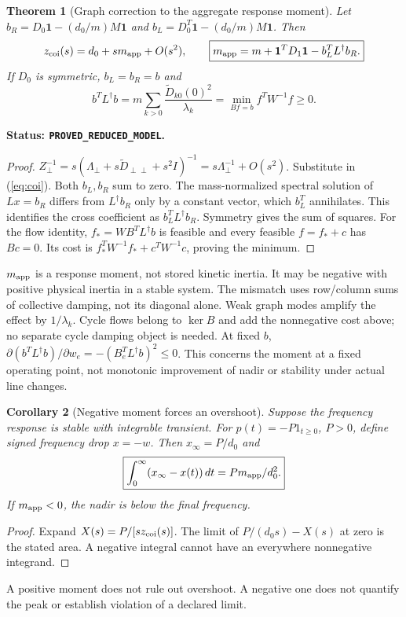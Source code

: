 \documentclass[11pt]{article}
\newtheorem{theorem}{Theorem}
\newtheorem{corollary}[theorem]{Corollary}
\newcommand{\one}{\mathbf{1}}
\newcommand{\status}[1]{\par\smallskip\noindent\textbf{Status: \texttt{#1}.}\ }
\begin{document}
\begin{theorem}[Graph correction to the aggregate response moment]
Let $b_R=D_0\one-(d_0/m)M\one$ and
$b_L=D_0^T\one-(d_0/m)M\one$. Then
\begin{equation}
 z_{\rm coi}(s)=d_0+s m_{\rm app}+O(s^2),\qquad
 \boxed{m_{\rm app}=m+\one^TD_1\one-b_L^TL^\dagger b_R.} \label{eq:moment}
\end{equation}
If $D_0$ is symmetric, $b_L=b_R=b$ and
\begin{equation}
 \boxed{b^TL^\dagger b
 =m\sum_{k>0}\frac{\widetilde D_{k0}(0)^2}{\lambda_k}
 =\min_{Bf=b} f^TW^{-1}f\geq0.} \label{eq:flow}
\end{equation}
\end{theorem}
\status{PROVED\_REDUCED\_MODEL}
\begin{proof}
$Z_\perp^{-1}=s(\Lambda_\perp+s\widetilde D_{\perp\perp}+s^2I)^{-1}
=s\Lambda_\perp^{-1}+O(s^2)$. Substitute in (\ref{eq:coi}).
Both $b_L,b_R$ sum to zero. The mass-normalized spectral solution of
$Lx=b_R$ differs from $L^\dagger b_R$ only by a constant vector,
which $b_L^T$ annihilates. This identifies the cross coefficient as
$b_L^TL^\dagger b_R$. Symmetry gives the sum of squares.
For the flow identity, $f_*=WB^TL^\dagger b$ is feasible and
every feasible $f=f_*+c$ has $Bc=0$.
Its cost is $f_*^TW^{-1}f_*+c^TW^{-1}c$, proving the minimum.
\end{proof}
$m_{\rm app}$ is a response moment, not stored kinetic inertia.
It may be negative with positive physical inertia in a stable system.
The mismatch uses row/column sums of collective damping, not its
diagonal alone. Weak graph modes amplify the effect by $1/\lambda_k$.
Cycle flows belong to $\ker B$ and add the nonnegative cost above;
no separate cycle damping object is needed.
At fixed $b$, $\partial(b^TL^\dagger b)/\partial w_e
=-(B_e^TL^\dagger b)^2\leq0$.
This concerns the moment at a fixed operating point, not monotonic
improvement of nadir or stability under actual line changes.

\begin{corollary}[Negative moment forces an overshoot]
Suppose the frequency response is stable with integrable transient.
For $p(t)=-P1_{t\geq0}$, $P>0$, define signed frequency drop $x=-w$.
Then $x_\infty=P/d_0$ and
\begin{equation}
 \boxed{\int_0^\infty(x_\infty-x(t))\,dt=P m_{\rm app}/d_0^2.} \label{eq:area}
\end{equation}
If $m_{\rm app}<0$, the nadir is below the final frequency.
\end{corollary}
\begin{proof}
Expand $X(s)=P/[s z_{\rm coi}(s)]$.
The limit of $P/(d_0s)-X(s)$ at zero is the stated area.
A negative integral cannot have an everywhere nonnegative integrand.
\end{proof}
A positive moment does not rule out overshoot. A negative one does
not quantify the peak or establish violation of a declared limit.
\end{document}
